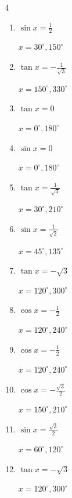 \begin{multicols}{4}
\begin{enumerate}
  \item $\displaystyle \sin{x}  = \frac{1}{2}$

        $\displaystyle x = 30^{\circ} , 150^{\circ}$

  \item $\displaystyle \tan{x}  = -\frac{1}{\sqrt{3}}$

        $\displaystyle x = 150^{\circ} , 330^{\circ}$

  \item $\displaystyle \tan{x}  = 0$

        $\displaystyle x = 0^{\circ} , 180^{\circ}$

  \item $\displaystyle \sin{x}  = 0$

        $\displaystyle x = 0^{\circ} , 180^{\circ}$

  \item $\displaystyle \tan{x}  = \frac{1}{\sqrt{3}}$

        $\displaystyle x = 30^{\circ} , 210^{\circ}$

  \item $\displaystyle \sin{x}  = \frac{1}{\sqrt{2}}$

        $\displaystyle x = 45^{\circ} , 135^{\circ}$

  \item $\displaystyle \tan{x}  = -\sqrt{3}$

        $\displaystyle x = 120^{\circ} , 300^{\circ}$

  \item $\displaystyle \cos{x}  = -\frac{1}{2}$

        $\displaystyle x = 120^{\circ} , 240^{\circ}$

  \item $\displaystyle \cos{x}  = -\frac{1}{2}$

        $\displaystyle x = 120^{\circ} , 240^{\circ}$

  \item $\displaystyle \cos{x}  = -\frac{\sqrt{3}}{2}$

        $\displaystyle x = 150^{\circ} , 210^{\circ}$

  \item $\displaystyle \sin{x}  = \frac{\sqrt{3}}{2}$

        $\displaystyle x = 60^{\circ} , 120^{\circ}$

  \item $\displaystyle \tan{x}  = -\sqrt{3}$

        $\displaystyle x = 120^{\circ} , 300^{\circ}$


\end{enumerate}
\end{multicols}
